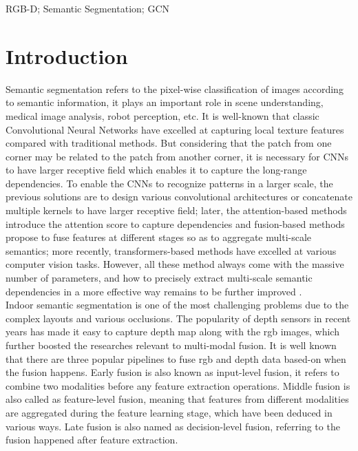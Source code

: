 \documentclass[journal]{IEEEtran}
\begin{document}
\begin{IEEEkeywords}
    RGB-D; Semantic Segmentation; GCN
    \end{IEEEkeywords}


\section{Introduction} \label{sec_introduction}
 
    Semantic segmentation refers to the pixel-wise classification of images according to semantic information, it plays an important role in scene understanding, medical image analysis, robot perception, etc\cite{mo2022review}. It is well-known that classic Convolutional Neural Networks \cite{krizhevsky2017alexnet} have excelled at capturing local texture features compared with traditional methods. But considering that the patch from one corner may be related to the patch from another corner, it is necessary for CNNs to have larger receptive field which enables it to capture the long-range dependencies. To enable the CNNs to recognize patterns in a larger scale, the previous solutions are to design various convolutional architectures \cite{wei2018dilated} or concatenate multiple kernels \cite{simonyan2014vgg} to have larger receptive field; later, the attention-based methods \cite{hu2018seNet} \cite{wang2018nonLocal} introduce the attention score to capture dependencies and fusion-based methods \cite{yuan2020OCrep} \cite{li2020gatedfuse} propose to fuse features at different stages so as to aggregate multi-scale semantics; more recently, transformers-based methods \cite{carion2020DETR}\cite{dosovitskiy2020ViT} have excelled at various computer vision tasks. However, all these method always come with the massive number of parameters, and how to precisely extract multi-scale semantic dependencies in a more effective way remains to be further improved . \\   
    
    Indoor semantic segmentation is one of the most challenging problems due to the complex layouts and various occlusions\cite{wang2021brief}. The popularity of depth sensors in recent years has made it easy to capture depth map along with the rgb images, which further boosted the researches relevant to multi-modal fusion. It is well known that there are three popular pipelines to fuse rgb and depth data based-on when the fusion happens. Early fusion is also known as input-level fusion, it refers to combine two modalities before any feature extraction operations. Middle fusion is also called as feature-level fusion, meaning that features from different modalities are aggregated during the feature learning stage, which have been deduced in various ways. Late fusion is also named as decision-level fusion, referring to the fusion happened after feature extraction. \\   
\end{document}
